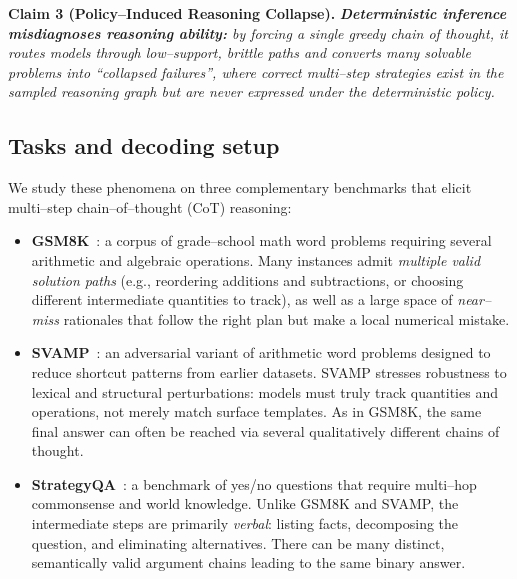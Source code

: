 \begin{tcolorbox}[colback=gray!5,colframe=black!60,sharp corners]
\textbf{Claim 3 (Policy--Induced Reasoning Collapse).}
\emph{\textbf{Deterministic inference misdiagnoses reasoning ability:} by forcing
a single greedy chain of thought, it routes models through low--support,
brittle paths and converts many solvable problems into ``collapsed failures'',
where correct multi--step strategies exist in the sampled reasoning graph but
are never expressed under the deterministic policy.}
\end{tcolorbox}


\subsection{Tasks and decoding setup}
\label{subsec:reasoning-tasks}

We study these phenomena on three complementary benchmarks that elicit
multi--step chain--of--thought (CoT) reasoning:

\begin{itemize}
  \item \textbf{GSM8K}~\citep{cobbe2021gsm8k}:
  a corpus of grade--school math word problems requiring several
  arithmetic and algebraic operations.
  Many instances admit \emph{multiple valid solution paths} (e.g.,
  reordering additions and subtractions, or choosing different
  intermediate quantities to track), as well as a large space of
  \emph{near--miss} rationales that follow the right plan but make a
  local numerical mistake.

  \item \textbf{SVAMP}~\citep{patel2021svamp}:
  an adversarial variant of arithmetic word problems designed to reduce
  shortcut patterns from earlier datasets.
  SVAMP stresses robustness to lexical and structural perturbations:
  models must truly track quantities and operations, not merely match
  surface templates.
  As in GSM8K, the same final answer can often be reached via several
  qualitatively different chains of thought.

  \item \textbf{StrategyQA}~\citep{geva2021strategyqa}:
  a benchmark of yes/no questions that require multi--hop commonsense
  and world knowledge.
  Unlike GSM8K and SVAMP, the intermediate steps are primarily
  \emph{verbal}: listing facts, decomposing the question, and
  eliminating alternatives.
  There can be many distinct, semantically valid argument chains leading
  to the same binary answer.
\end{itemize}

